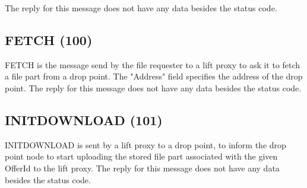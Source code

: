 The reply for this message does not have any data besides the status code.

\begin{figure}[H]
    \centering
\end{figure}

\subsection{FETCH (100)}

FETCH is the message send by the file requester to a lift proxy to ask it to
fetch a file part from a drop point. The "Address" field specifies the address
of the drop point. The reply for this message does not have any data besides
the status code.

\begin{figure}[H]
    \centering
\end{figure}

\subsection{INITDOWNLOAD (101)}

INITDOWNLOAD is sent by a lift proxy to a drop point, to inform the drop point
node to start uploading the stored file part associated with the given OfferId
to the lift proxy. The reply for this message does not have any data besides
the status code.

\begin{figure}[H]
    \centering
\end{figure}

